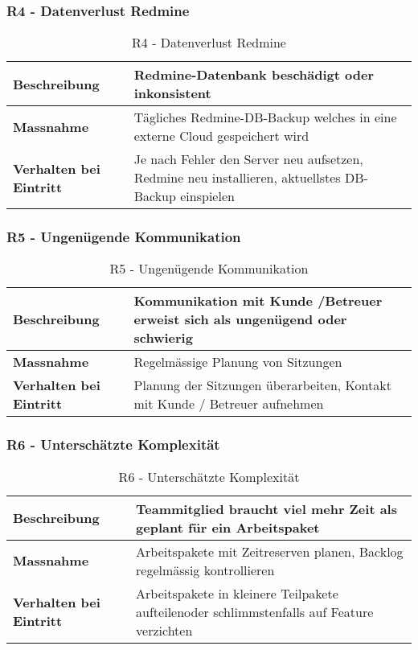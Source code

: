\subsubsection{R4 - Datenverlust Redmine}
\begin{table}[H]
    \centering
    \def\arraystretch{2}
    \begin{tabular}{| p{4.5cm} | p{11.5cm} |} \hline
        \textbf{Beschreibung} & Redmine-Datenbank beschädigt oder inkonsistent\\ \hline
        \textbf{Massnahme} & Tägliches Redmine-DB-Backup welches in eine externe Cloud gespeichert wird\\ \hline
        \textbf{Verhalten bei Eintritt} & Je nach Fehler den Server neu aufsetzen, Redmine neu installieren, aktuellstes DB-Backup einspielen\\ \hline 
    \end{tabular}
    \caption{R4 - Datenverlust Redmine}
\end{table}

\subsubsection{R5 - Ungenügende Kommunikation}
\begin{table}[H]
    \centering
    \def\arraystretch{2}
    \begin{tabular}{| p{4.5cm} | p{11.5cm} |} \hline
        \textbf{Beschreibung} & Kommunikation mit Kunde /Betreuer erweist sich als ungenügend oder schwierig \\ \hline
        \textbf{Massnahme} & Regelmässige Planung von Sitzungen\\ \hline
        \textbf{Verhalten bei Eintritt} & Planung der Sitzungen überarbeiten, Kontakt mit Kunde / Betreuer aufnehmen \\ \hline 
    \end{tabular}
    \caption{R5 - Ungenügende Kommunikation}
\end{table}

\subsubsection{R6 - Unterschätzte Komplexität}
\begin{table}[H]
    \centering
    \def\arraystretch{2}
    \begin{tabular}{| p{4.5cm} | p{11.5cm} |} \hline
        \textbf{Beschreibung} & Teammitglied braucht viel mehr Zeit als geplant für ein Arbeitspaket\\ \hline
        \textbf{Massnahme} & Arbeitspakete mit Zeitreserven planen, Backlog regelmässig kontrollieren\\ \hline
        \textbf{Verhalten bei Eintritt} & Arbeitspakete in kleinere Teilpakete aufteilenoder schlimmstenfalls auf Feature verzichten\\ \hline 
    \end{tabular}
    \caption{R6 - Unterschätzte Komplexität}
\end{table}

